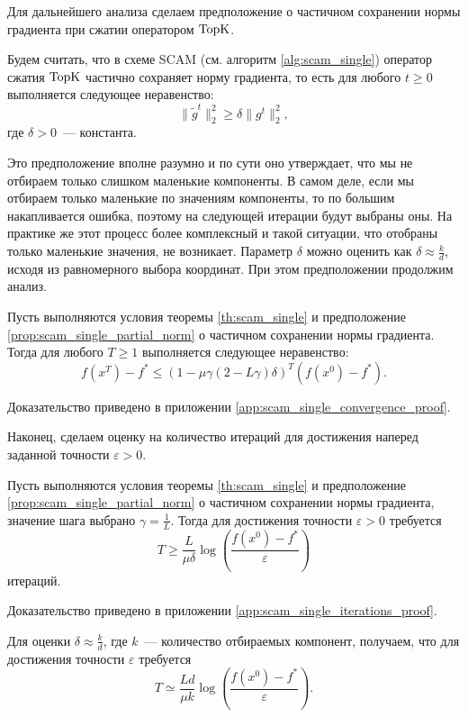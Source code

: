     Для дальнейшего анализа сделаем предположение о частичном сохранении нормы градиента при сжатии оператором $\operatorname{TopK}$.
    \begin{proposition}\label{prop:scam_single_partial_norm}
        Будем считать, что в схеме SCAM (см. алгоритм \ref{alg:scam_single}) оператор сжатия $\operatorname{TopK}$ частично сохраняет норму градиента, то есть для любого $t \geq 0$ выполняется следующее неравенство:
        \begin{equation}
            \|\tilde{g}^t\|_2^2 \geq \delta \|g^t\|_2^2,
        \end{equation}
        где $\delta > 0$~--- константа.
    \end{proposition}
    Это предположение вполне разумно и по сути оно утверждает, что мы не отбираем только слишком маленькие компоненты. В самом деле, если мы отбираем только маленькие по значениям компоненты, то по большим накапливается ошибка, поэтому на следующей итерации будут выбраны оны. На практике же этот процесс более комплексный и такой ситуации, что отобраны только маленькие значения, не возникает. Параметр $\delta$ можно оценить как $\delta \approx \frac{k}{d}$, исходя из равномерного выбора координат. При этом предположении продолжим анализ.
    \begin{theorem}\label{th:scam_single_convergence}
        Пусть выполняются условия теоремы \ref{th:scam_single} и предположение \ref{prop:scam_single_partial_norm} о частичном сохранении нормы градиента. Тогда для любого $T \geq 1$ выполняется следующее неравенство:
        \begin{equation}
            f(x^T) - f^* \leq (1 - \mu \gamma (2 - L \gamma) \delta)^T (f(x^0) - f^*).
        \end{equation}
    \end{theorem}
    Доказательство приведено в приложении \ref{app:scam_single_convergence_proof}.

    Наконец, сделаем оценку на количество итераций для достижения наперед заданной точности $\varepsilon > 0$.
    \begin{corollary}\label{cor:scam_single_iterations}
        Пусть выполняются условия теоремы \ref{th:scam_single} и предположение \ref{prop:scam_single_partial_norm} о частичном сохранении нормы градиента, значение шага выбрано $\gamma = \frac{1}{L}$. Тогда для достижения точности $\varepsilon > 0$ требуется
        \begin{equation}
            T \geq \frac{L}{\mu \delta} \log\left(\frac{f(x^0) - f^*}{\varepsilon}\right)
        \end{equation}
        итераций.
    \end{corollary}
    Доказательство приведено в приложении \ref{app:scam_single_iterations_proof}.

    Для оценки $\delta \approx \frac{k}{d}$, где $k$~--- количество отбираемых компонент, получаем, что для достижения точности $\varepsilon$ требуется
    \begin{equation}
        T \simeq \frac{L d}{\mu k} \log\left(\frac{f(x^0) - f^*}{\varepsilon}\right).
    \end{equation}
